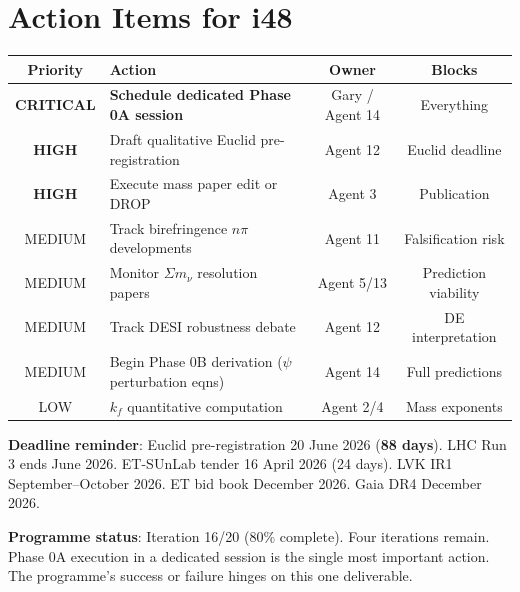 \documentclass[11pt,a4paper]{article}
\begin{document}
\part{Action Items for i48}

\begin{center}
\begin{tabular}{clcc}
\toprule
\textbf{Priority} & \textbf{Action} & \textbf{Owner} & \textbf{Blocks} \\
\midrule
\textbf{CRITICAL} & \textbf{Schedule dedicated Phase 0A session} & Gary / Agent 14 & Everything \\
\textbf{HIGH} & Draft qualitative Euclid pre-registration & Agent 12 & Euclid deadline \\
\textbf{HIGH} & Execute mass paper edit or DROP & Agent 3 & Publication \\
MEDIUM & Track birefringence $n\pi$ developments & Agent 11 & Falsification risk \\
MEDIUM & Monitor $\Sigma m_\nu$ resolution papers & Agent 5/13 & Prediction viability \\
MEDIUM & Track DESI robustness debate & Agent 12 & DE interpretation \\
MEDIUM & Begin Phase 0B derivation ($\psi$ perturbation eqns) & Agent 14 & Full predictions \\
LOW & $k_f$ quantitative computation & Agent 2/4 & Mass exponents \\
\bottomrule
\end{tabular}
\end{center}

\textbf{Deadline reminder}: Euclid pre-registration 20 June 2026 (\textbf{88 days}). LHC Run 3 ends June 2026. ET-SUnLab tender 16 April 2026 (24 days). LVK IR1 September--October 2026. ET bid book December 2026. Gaia DR4 December 2026.

\textbf{Programme status}: Iteration 16/20 (80\% complete). Four iterations remain. Phase 0A execution in a dedicated session is the single most important action. The programme's success or failure hinges on this one deliverable.
\end{document}
